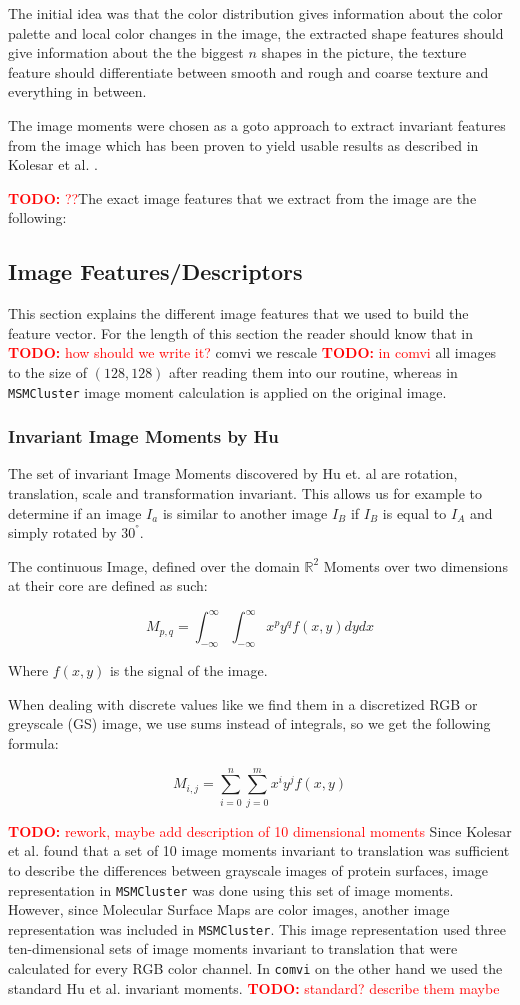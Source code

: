 \documentclass[journal]{vgtc}       %
\newcommand{\todo}[1]{\textcolor{red}{\textbf{TODO:} #1}}
\begin{document}
The initial idea was that the color distribution gives information about the color palette and local color changes in the image, the extracted shape features should give information about the the biggest \( n \) shapes in the picture, the texture feature should differentiate between smooth and rough and coarse texture and everything in between.

The image moments were chosen as a goto approach to extract invariant features from the image which has been proven to yield usable results as described in Kolesar et al. \cite{kolesar}.

\todo{??}The exact image features that we extract from the image are the following:
\subsection{Image Features/Descriptors}
This section explains the different image features that we used to build the feature vector.
For the length of this section the reader should know that in \todo{how should we write it?} comvi we rescale \todo{in comvi} all images to the size of $(128,128)$ after reading them into our routine, whereas in \verb|MSMCluster| image moment calculation is applied on the original image.
\subsubsection{Invariant Image Moments by Hu}\label{subsec:humom}

The set of invariant Image Moments discovered by Hu et. al  are rotation, translation, scale and transformation  invariant. This allows us for example to determine if an image $I_a$ is similar to another image $I_B$ if $I_B$ is equal to $I_A$ and simply rotated by $30^{°}$.

The continuous  Image, defined over the domain \(\mathbb{R}^2\) Moments  over two dimensions at their core are defined as such:

\[M_{p,q} = \int^\infty_{- \infty}\int^\infty_{- \infty} x^py^q f(x,y) dy dx \]

Where \(f(x, y)\) is the signal of the image.  

When dealing with discrete values like we find them in a discretized RGB or greyscale (GS) image, we use sums instead of integrals, so we get the following formula:

\[M_{i,j} = \sum^n_{i=0}\sum^m_{j=0} x^i y^j f(x,y) \]


\todo{rework, maybe add description of 10 dimensional moments}
Since Kolesar et al. found that a set of 10 image moments invariant to translation was sufficient to describe the differences between grayscale images of protein surfaces, image representation in \verb|MSMCluster| was done using this set of image moments. However, since Molecular Surface Maps are color images, another image representation was included in \verb|MSMCluster|. This image representation used three ten-dimensional sets of image moments invariant to translation that were calculated for every RGB color channel. In \verb|comvi| on the other hand we used the standard Hu et al. invariant moments. \todo{standard? describe them maybe}
\end{document}
